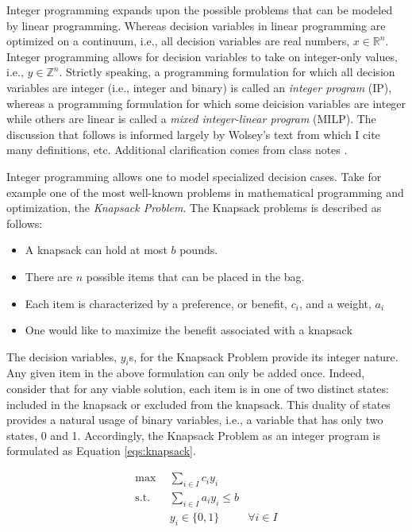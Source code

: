 Integer programming expands upon the possible problems that can be modeled by
linear programming. Whereas decision variables in linear programming are
optimized on a continuum, i.e., all decision variables are real numbers,
$x \in \mathbb{R}^n$. Integer programming allows for decision variables to take
on integer-only values, i.e., $y \in \mathbb{Z}^n$. Strictly speaking, a
programming formulation for which all decision variables are integer (i.e.,
integer and binary) is called an \textit{integer program} (IP), whereas a
programming formulation for which some deicision variables are integer while
others are linear is called a \textit{mixed integer-linear program} (MILP). The
discussion that follows is informed largely by Wolsey's
text \cite{wolsey_integer_1998} from which I cite many definitions,
etc. Additional clarification comes from class notes \cite{luedtke_class_2010}.

Integer programming allows one to model specialized decision cases. Take for
example one of the most well-known problems in mathematical programming and
optimization, the \textit{Knapsack Problem}. The Knapsack problems is described
as follows:

\begin{itemize}
        \item A knapsack can hold at most $b$ pounds. 
        \item There are $n$ possible items that can be placed in the bag.
        \item Each item is characterized by a preference, or benefit, $c_i$, 
              and a weight, $a_i$
        \item One would like to maximize the benefit associated with a knapsack
\end{itemize}

The decision variables, $y_i$s, for the Knapsack Problem provide its integer
nature. Any given item in the above formulation can only be added once. Indeed,
consider that for any viable solution, each item is in one of two distinct
states: included in the knapsack or excluded from the knapsack. This duality of
states provides a natural usage of binary variables, i.e., a variable that has
only two states, 0 and 1. Accordingly, the Knapsack Problem as an integer
program is formulated as Equation \ref{eqs:knapsack}.

\begin{subequations}\label{eqs:knapsack}
  \begin{align}
    \max \:\: & 
    \sum_{i \in I} c_i y_i
    & \\
    \text{s.t.} \:\: &
    \sum_{i \in I} a_i y_i \leq b 
    & \\
    &
    y_i \in \{ 0, 1 \}
    &
    \forall i \in I
  \end{align}
\end{subequations}

